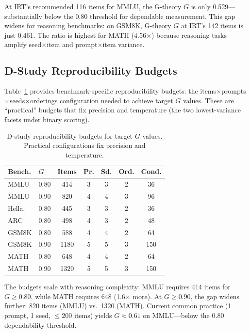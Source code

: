 \documentclass[11pt,a4paper]{article}
\newcommand{\Gcoeff}{\ensuremath{G}}
\begin{document}
At IRT's recommended 116 items for MMLU, the G-theory $\Gcoeff$ is only 0.529---substantially below the 0.80 threshold for dependable measurement.
This gap widens for reasoning benchmarks: on GSM8K, G-theory $\Gcoeff$ at IRT's 142 items is just 0.461.
The ratio is highest for MATH (4.56$\times$) because reasoning tasks amplify seed$\times$item and prompt$\times$item variance.

\subsection{D-Study Reproducibility Budgets}
\label{sec:dstudy}

Table~\ref{tab:dstudy} provides benchmark-specific reproducibility budgets: the items$\times$prompts$\times$seeds$\times$orderings configuration needed to achieve target $\Gcoeff$ values.
These are ``practical'' budgets that fix precision and temperature (the two lowest-variance facets under binary scoring).

\begin{table}[t]
\centering
\caption{D-study reproducibility budgets for target $\Gcoeff$ values.  Practical configurations fix precision and temperature.}
\label{tab:dstudy}
\small
\begin{tabular}{llccccc}
\toprule
\textbf{Bench.} & \textbf{$\Gcoeff$} & \textbf{Items} & \textbf{Pr.} & \textbf{Sd.} & \textbf{Ord.} & \textbf{Cond.} \\
\midrule
MMLU  & 0.80 & 414  & 3 & 3 & 2 & 36 \\
MMLU  & 0.90 & 820  & 4 & 4 & 3 & 96 \\
Hella.\ & 0.80 & 445  & 3 & 3 & 2 & 36 \\
ARC   & 0.80 & 498  & 4 & 3 & 2 & 48 \\
GSM8K & 0.80 & 588  & 4 & 4 & 2 & 64 \\
GSM8K & 0.90 & 1180 & 5 & 5 & 3 & 150 \\
MATH  & 0.80 & 648  & 4 & 4 & 2 & 64 \\
MATH  & 0.90 & 1320 & 5 & 5 & 3 & 150 \\
\bottomrule
\end{tabular}
\end{table}

The budgets scale with reasoning complexity: MMLU requires 414 items for $\Gcoeff\geq0.80$, while MATH requires 648 (1.6$\times$ more).
At $\Gcoeff\geq0.90$, the gap widens further: 820 items (MMLU) vs.\ 1320 (MATH).
Current common practice (1 prompt, 1 seed, $\leq$200 items) yields $\Gcoeff\approx0.61$ on MMLU---below the 0.80 dependability threshold.
\end{document}
